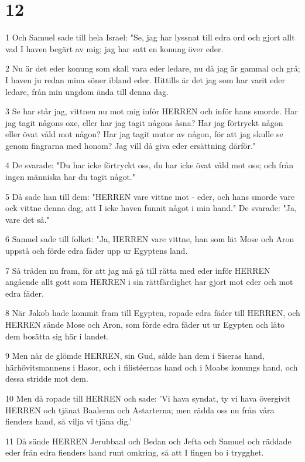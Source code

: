 \chapter{12}

\par 1 Och Samuel sade till hela Israel: "Se, jag har lyssnat till edra ord och gjort allt vad I haven begärt av mig; jag har satt en konung över eder.
\par 2 Nu är det eder konung som skall vara eder ledare, nu då jag är gammal och grå; I haven ju redan mina söner ibland eder. Hittills är det jag som har varit eder ledare, från min ungdom ända till denna dag.
\par 3 Se har står jag, vittnen nu mot mig inför HERREN och inför hans smorde. Har jag tagit någons oxe, eller har jag tagit någons åsna? Har jag förtryckt någon eller övat våld mot någon? Har jag tagit mutor av någon, för att jag skulle se genom fingrarna med honom? Jag vill då giva eder ersättning därför."
\par 4 De svarade: "Du har icke förtryckt oss, du har icke övat våld mot oss; och från ingen människa har du tagit något."
\par 5 Då sade han till dem: "HERREN vare vittne mot - eder, och hans smorde vare ock vittne denna dag, att I icke haven funnit något i min hand." De svarade: "Ja, vare det så."
\par 6 Samuel sade till folket: "Ja, HERREN vare vittne, han som lät Mose och Aron uppstå och förde edra fäder upp ur Egyptens land.
\par 7 Så träden nu fram, för att jag må gå till rätta med eder inför HERREN angående allt gott som HERREN i sin rättfärdighet har gjort mot eder och mot edra fäder.
\par 8 När Jakob hade kommit fram till Egypten, ropade edra fäder till HERREN, och HERREN sände Mose och Aron, som förde edra fäder ut ur Egypten och läto dem bosätta sig här i landet.
\par 9 Men när de glömde HERREN, sin Gud, sålde han dem i Siseras hand, härhövitsmannens i Hasor, och i filistéernas hand och i Moabs konungs hand, och dessa stridde mot dem.
\par 10 Men då ropade till HERREN och sade: 'Vi hava syndat, ty vi hava övergivit HERREN och tjänat Baalerna och Astarterna; men rädda oss nu från våra fienders hand, så vilja vi tjäna dig.'
\par 11 Då sände HERREN Jerubbaal och Bedan och Jefta och Samuel och räddade eder från edra fienders hand runt omkring, så att I fingen bo i trygghet.
